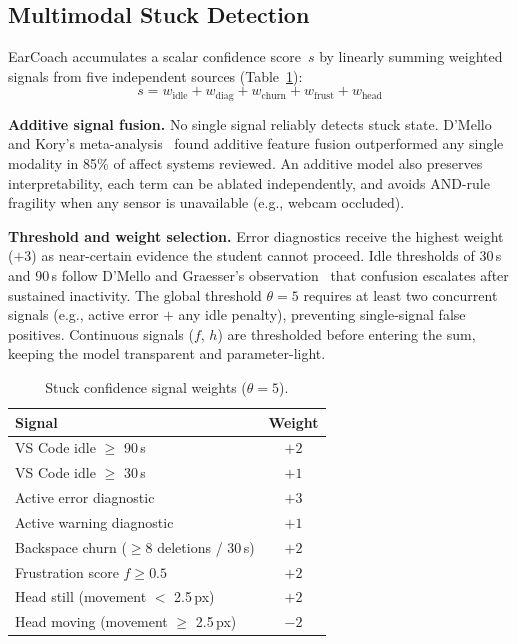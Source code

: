 \documentclass[sigconf,anonymous,review]{acmart}
\begin{document}
\subsection{Multimodal Stuck Detection}
\label{sec:scorer}

EarCoach accumulates a scalar confidence score~$s$ by linearly summing
weighted signals from five independent sources
(Table~\ref{tab:scorer}):\vspace{-4pt}
\begin{equation}
s = w_{\text{idle}} + w_{\text{diag}} + w_{\text{churn}}
  + w_{\text{frust}} + w_{\text{head}}
\end{equation}\vspace{-4pt}

\noindent\textbf{Additive signal fusion.}
No single signal reliably detects stuck state. D'Mello and Kory's
meta-analysis~\cite{dmellokory2015} found additive feature fusion
outperformed any single modality in 85\% of affect systems reviewed. An
additive model also preserves interpretability, each term can be ablated
independently, and avoids AND-rule fragility when any sensor is
unavailable (e.g., webcam occluded).

\noindent\textbf{Threshold and weight selection.}
Error diagnostics receive the highest weight ($+3$) as near-certain
evidence the student cannot proceed. Idle thresholds of 30\,s and 90\,s
follow D'Mello and Graesser's observation~\cite{dmello2012} that
confusion escalates after sustained inactivity. The global threshold
$\theta\!=\!5$ requires at least two concurrent signals (e.g., active
error $+$ any idle penalty), preventing single-signal false positives.
Continuous signals ($f$, $h$) are thresholded before entering the sum,
keeping the model transparent and parameter-light.

\begin{table}[h]
\small\centering
\setlength{\tabcolsep}{8pt}
\caption{Stuck confidence signal weights ($\theta = 5$).}
\label{tab:scorer}
\begin{tabular}{lc}
\toprule
\textbf{Signal} & \textbf{Weight} \\
\midrule
VS Code idle $\geq$ 90\,s                  & $+2$ \\
VS Code idle $\geq$ 30\,s                  & $+1$ \\
Active error diagnostic                     & $+3$ \\
Active warning diagnostic                   & $+1$ \\
Backspace churn ($\geq$8 deletions / 30\,s) & $+2$ \\
Frustration score $f \geq 0.5$             & $+2$ \\
Head still (movement $<$ 2.5\,px)          & $+2$ \\
Head moving (movement $\geq$ 2.5\,px)      & $-2$ \\
\bottomrule
\end{tabular}
\end{table}
\end{document}

